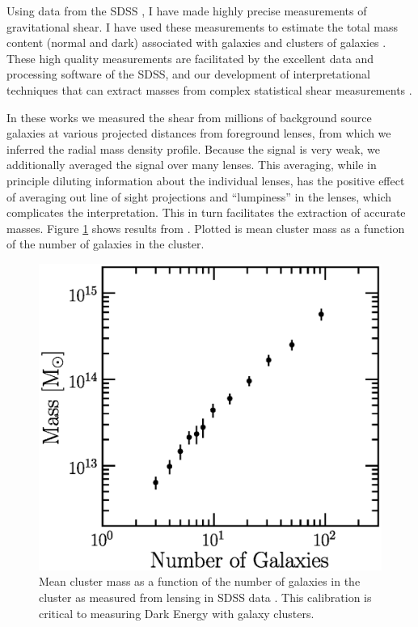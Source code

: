 \documentclass[12pt]{article}
\begin{document}
Using data from the SDSS \cite{York00}, I have made highly precise measurements
of gravitational shear. I have used these measurements to estimate the total
mass content (normal and dark) associated with galaxies and clusters of
galaxies
\cite{fis00,Sheldon04,SheldonLensing07,JohnstonLensing07,SheldonM2L07}.  These
high quality measurements are facilitated by the excellent data and processing
software of the SDSS, and our development of interpretational techniques that
can extract masses from complex statistical shear measurements
\cite{JohnstonInvert07}.

In these works we measured the shear from millions of background source
galaxies at various projected distances from foreground lenses, from which we
inferred the radial mass density profile.  Because the signal is very weak, we
additionally averaged the signal over many lenses.  This averaging, while in
principle diluting information about the individual lenses, has the positive
effect of averaging out line of sight projections and ``lumpiness'' in the
lenses, which complicates the interpretation.  This in turn facilitates the
extraction of accurate masses.  Figure \ref{fig:massngals} shows results
from \cite{SheldonLensing07,JohnstonLensing07}. Plotted is mean cluster mass as
a function of the number of galaxies in the cluster.  

\begin{figure}[p]
\centering
\includegraphics[scale=0.7]{mass-rich-plot.eps}
\caption{Mean cluster mass as a function of the number of
galaxies in the cluster as measured from lensing in SDSS
data \cite{SheldonLensing07,JohnstonLensing07}. This calibration
is critical to measuring Dark Energy with galaxy clusters.\label{fig:massngals}}
\end{figure}
\end{document}
